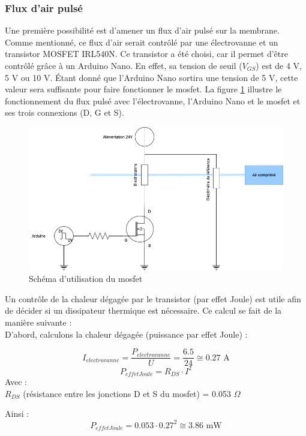 \subsubsection{Flux d'air pulsé}
Une première possibilité est d'amener un flux d'air pulsé sur la membrane. Comme mentionné, ce flux d'air serait contrôlé par une électrovanne et un
transistor MOSFET IRL540N. Ce transistor a été choisi, car il permet d'être contrôlé grâce à un Arduino Nano. En effet, sa tension de seuil
($V_{GS}$) est de 4 V, 5 V ou 10 V. Étant donné que l'Arduino Nano sortira une tension de 5 V, cette valeur sera suffisante pour faire fonctionner
le \gls{mosfet}. La figure \ref{fig:MOSFET} illustre le fonctionnement du flux pulsé avec l'électrovanne, l'Arduino Nano et le \gls{mosfet} et 
ses trois connexions (D, G et S). 
\begin{figure}[H]
    \centering
    \includegraphics[scale=0.6]{assets/figures/MOSFET.png}
    \caption{Schéma d'utilisation du \gls{mosfet}}
    \label{fig:MOSFET}
\end{figure}
Un contrôle de la chaleur dégagée par le transistor (par effet Joule) est utile afin de décider si un dissipateur thermique est nécessaire. Ce calcul se fait
de la manière suivante :\\

D'abord, calculons la chaleur dégagée (puissance par effet Joule) :

\[I_{electrovanne} = \frac{P_{electrovanne}}{U} = \frac{6.5}{24} \cong 0.27 \text{ A} \]
\[P_{effetJoule} = R_{DS}\cdot I^2\]
Avec :\\
$R_{DS}$ (résistance entre les jonctions D et S du \gls{mosfet}) = 0.053 $\Omega$

Ainsi :
\begin{equation}
    P_{effetJoule} = 0.053\cdot 0.27^2 \cong 3.86 \text{ mW}
\end{equation}

